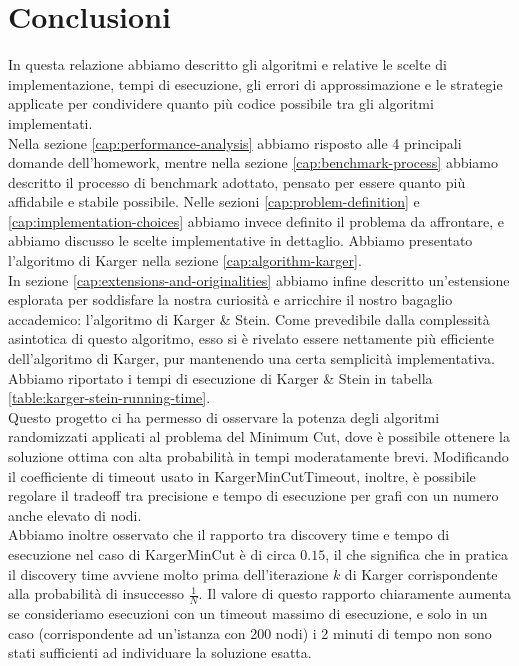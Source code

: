 \section{Conclusioni}
\label{cap:conclusions}

\noindent In questa relazione abbiamo descritto gli algoritmi e relative le scelte di implementazione, tempi
di esecuzione, gli errori di approssimazione e le strategie applicate per condividere quanto più codice possibile tra gli algoritmi implementati. \\

\noindent Nella sezione \ref{cap:performance-analysis} abbiamo risposto alle 4 principali domande dell’homework, mentre nella sezione
\ref{cap:benchmark-process} abbiamo descritto il processo di benchmark adottato, pensato per essere quanto più affidabile e
stabile possibile. Nelle sezioni \ref{cap:problem-definition} e \ref{cap:implementation-choices}
abbiamo invece definito il problema da affrontare, e abbiamo discusso le scelte implementative in dettaglio. Abbiamo presentato l'algoritmo di Karger nella sezione \ref{cap:algorithm-karger}. \\

\noindent In sezione \ref{cap:extensions-and-originalities} abbiamo infine descritto un'estensione esplorata per soddisfare la nostra curiosità e arricchire il nostro bagaglio accademico: l'algoritmo di Karger \& Stein. Come prevedibile dalla complessità asintotica di questo algoritmo, esso si è rivelato essere nettamente più efficiente dell'algoritmo di Karger, pur mantenendo una certa semplicità implementativa. Abbiamo riportato i tempi di esecuzione di Karger \& Stein in tabella \ref{table:karger-stein-running-time}. \\

\noindent Questo progetto ci ha permesso di osservare la potenza degli algoritmi randomizzati applicati al problema del Minimum Cut, dove è possibile ottenere la soluzione ottima con alta probabilità in tempi moderatamente brevi. Modificando il coefficiente di timeout usato in KargerMinCutTimeout, inoltre, è possibile regolare il tradeoff tra precisione e tempo di esecuzione per grafi con un numero anche elevato di nodi. \\

\noindent Abbiamo inoltre osservato che il rapporto tra discovery time e tempo di esecuzione nel caso di KargerMinCut è di circa $0.15$, il che significa che in pratica il discovery time avviene molto prima dell'iterazione $k$ di Karger corrispondente alla probabilità di insuccesso $\frac{1}{N}$. Il valore di questo rapporto chiaramente aumenta se consideriamo esecuzioni con un timeout massimo di esecuzione, e solo in un caso (corrispondente ad un'istanza con 200 nodi) i 2 minuti di tempo non sono stati sufficienti ad individuare la soluzione esatta. \\

